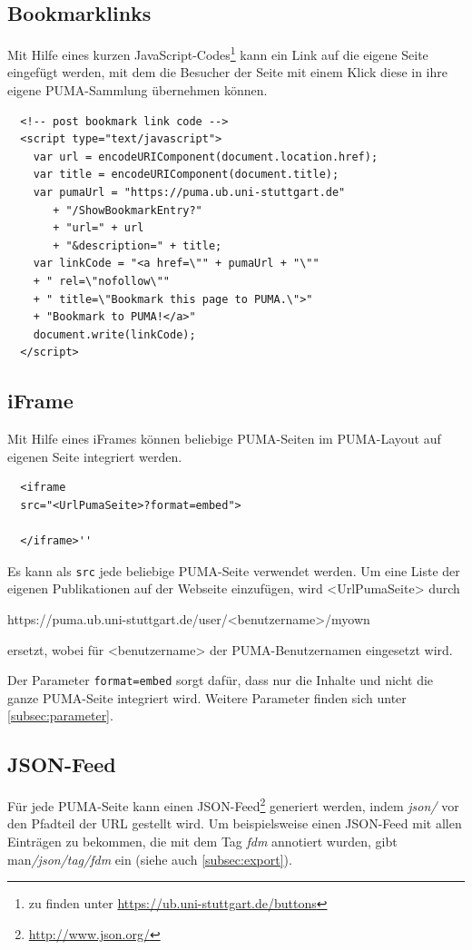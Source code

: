 \subsection{Bookmarklinks}
\label{subsec:bookmarklinks}
Mit Hilfe eines kurzen JavaScript-Codes\footnote{zu finden unter \url{https://ub.uni-stuttgart.de/buttons}} kann ein Link auf die eigene Seite eingefügt werden, mit dem die Besucher der Seite mit einem Klick diese in ihre eigene PUMA-Sammlung übernehmen können.
\lstset{language=JavaScript}
\begin{lstlisting}
  <!-- post bookmark link code -->
  <script type="text/javascript">
    var url = encodeURIComponent(document.location.href);
    var title = encodeURIComponent(document.title);
    var pumaUrl = "https://puma.ub.uni-stuttgart.de"
       + "/ShowBookmarkEntry?"
       + "url=" + url
       + "&description=" + title;
    var linkCode = "<a href=\"" + pumaUrl + "\""
    + " rel=\"nofollow\""
    + " title=\"Bookmark this page to PUMA.\">"
    + "Bookmark to PUMA!</a>"
    document.write(linkCode);
  </script>
\end{lstlisting}

\subsection{iFrame}
\label{subsec:iFrame}
Mit Hilfe eines iFrames können beliebige PUMA-Seiten im PUMA-Layout auf eigenen Seite integriert werden. 
\lstset{language=HTML}
\begin{lstlisting}
  <iframe
  src="<UrlPumaSeite>?format=embed">

  </iframe>''
\end{lstlisting}

Es kann als \texttt{src} jede beliebige PUMA-Seite verwendet werden. Um eine Liste der eigenen Publikationen  auf der Webseite einzufügen, wird <UrlPumaSeite> durch \begin{small}https://puma.ub.uni-stuttgart.de/user/<benutzername>/myown\end{small} ersetzt, wobei  für <benutzername> der PUMA-Benutzernamen eingesetzt wird.

Der Parameter \texttt{format=embed} sorgt dafür, dass nur die Inhalte und nicht die ganze PUMA-Seite integriert wird. Weitere Parameter finden sich unter \autoref{subsec:parameter}.

\subsection{JSON-Feed}
\label{subsec:jsonFeed}
Für jede PUMA-Seite kann einen JSON-Feed\footnote{\url{http://www.json.org/}} generiert werden, indem  \textit{json/} vor den Pfadteil der URL gestellt wird. Um beispielsweise einen JSON-Feed mit allen Einträgen zu bekommen, die mit dem Tag \textit{fdm} annotiert wurden, gibt man\textit{/json/tag/fdm} ein (siehe auch \autoref{subsec:export}). 

